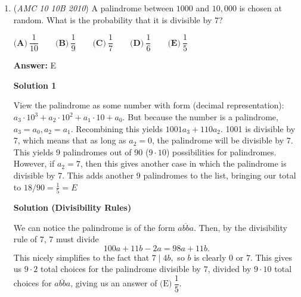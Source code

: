 \begin{enumerate}
 
Call the radius of circle $O$ $r$.$OG=2r= \text{height of equilateral triangle} + \text{height of regular hexagon} + r$

 The height of an equilateral triangle of side length $1$ is $\frac{\sqrt{3}}{2}$. The height of a regular hexagon of side length $1$ is $\sqrt{3}$. Therefore,$OG=\frac{\sqrt{3}}{2} + \sqrt{3} + r$.

 We can now set up the following equation:

 $\frac{\sqrt{3}}{2} + \sqrt{3} + r=2r$
$\frac{\sqrt{3}}{2} + \sqrt{3}=r$
$\frac{3\sqrt{3}}{2}=r$

 The area of Circle $O$ equals $\pi r^2=\frac{27}{4} \pi$

 Therefore, the ratio of the areas is $\frac{\frac{27}{4}}{\frac{1}{12}}=\boxed{\textbf{(D)}\ 81}$



	\item (\textit{AMC 10 10B 2010}) A palindrome between $1000$ and $10,000$ is chosen at random. What is the probability that it is divisible by $7$?


 $\textbf{(A)}\ \dfrac{1}{10} \qquad \textbf{(B)}\ \dfrac{1}{9} \qquad \textbf{(C)}\ \dfrac{1}{7} \qquad \textbf{(D)}\ \dfrac{1}{6} \qquad \textbf{(E)}\ \dfrac{1}{5}$

 \textbf{Answer: }E



\textbf{Solution 1}

View the palindrome as some number with form (decimal representation):$a_3 \cdot 10^3 + a_2 \cdot 10^2 + a_1 \cdot 10 + a_0$. But because the number is a palindrome, $a_3 = a_0, a_2 = a_1$. Recombining this yields $1001a_3 + 110a_2$. 1001 is divisible by 7, which means that as long as $a_2 = 0$, the palindrome will be divisible by 7. This yields 9 palindromes out of 90 ($9 \cdot 10$) possibilities for palindromes. However, if $a_2 = 7$, then this gives another case in which the palindrome is divisible by 7. This adds another 9 palindromes to the list, bringing our total to $18/90 = \boxed {\frac{1}{5} } = \boxed {E}$




\textbf{Solution (Divisibility Rules)}

We can notice the palindrome is of the form $\overline{abba}$. Then, by the divisibility rule of $7$, $7$ must divide 
 \[100a+11b-2a = 98a+11b.\] This nicely simplifies to the fact that $7 \mid 4b,$ so $b$ is clearly $0$ or $7$. This gives us $9 \cdot 2$ total choices for the palindrome divisible by $7$, divided by $9 \cdot 10$ total choices for $\overline{abba}$, giving us an answer of $\boxed{\text{(E)}} \ \dfrac{1}{5}$.


\end{enumerate}
